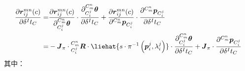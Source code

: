 \begin{equation}
  \label{equ:jacobian_tci}
  \begin{aligned}
    \frac{\partial \boldsymbol{r}_{ij}^{mn}(c)}{\partial \delta {^{I}t_{C}}}= &
    \frac{\partial \boldsymbol{r}_{ij}^{mn}(c)}{\partial  ^{C_m^n}_{C_i^j}\boldsymbol{\theta}}\cdot
    \frac{\partial ^{C_m^n}_{C_i^j}\boldsymbol{\theta}}{\partial \delta{^{I}t_{C}}}
    +
    \frac{\partial \boldsymbol{r}_{ij}^{mn}(c)}{\partial {^{C_m^n}\boldsymbol{p}_{C_i^j}}}\cdot
    \frac{\partial {^{C_m^n}\boldsymbol{p}_{C_i^j}}}{\partial \delta {^{I}t_{C}}}
    \\
    =                                                                         & -\boldsymbol{J}_{\pi}\cdot{{^{C_m^n}_{C_i^j}\boldsymbol{R}}\cdot\liehat{s \cdot\pi^{-1}\left(\boldsymbol{p}_i^j,\lambda_i^j\right)}}
    \cdot
    \frac{\partial ^{C_m^n}_{C_i^j}\boldsymbol{\theta}}{\partial \delta{^{I}t_{C}}}
    +
    \boldsymbol{J}_{\pi}\cdot\frac{\partial {^{C_m^n}\boldsymbol{p}_{C_i^j}}}{\partial \delta {^{I}t_{C}}}
  \end{aligned}
\end{equation}
其中：
